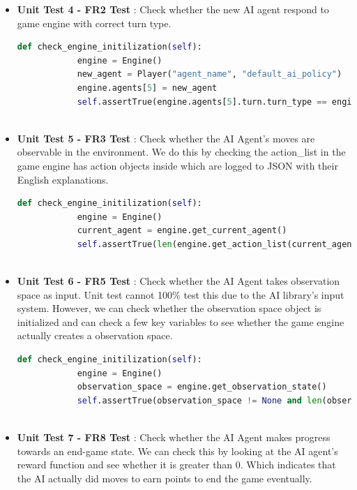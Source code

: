 \documentclass[12pt, titlepage]{article}
\providecommand{\DIFaddtex}[1]{{\protect\color{blue}\uwave{#1}}} %
\providecommand{\DIFaddbegin}{} %
\providecommand{\DIFaddend}{} %
\providecommand{\DIFadd}[1]{\texorpdfstring{\DIFaddtex{#1}}{#1}} %
\begin{document}
\begin{itemize}
    \item \textbf{Unit Test 4 - FR2 Test \DIFaddbegin \DIFadd{(\ref{FRT2})}\DIFaddend }: Check whether the new AI agent respond to game engine with correct turn type.

    \begin{lstlisting}[language=Python]
        def check_engine_initilization(self):
            engine = Engine()
            new_agent = Player("agent_name", "default_ai_policy")
            engine.agents[5] = new_agent
            self.assertTrue(engine.agents[5].turn.turn_type == engine.turn.turn_type)
    
\end{lstlisting}

    \item \textbf{Unit Test 5 - FR3 Test \DIFaddbegin \DIFadd{(\ref{FRT3})}\DIFaddend }: Check whether the AI Agent’s moves are observable in the environment. We do this by checking the action\_list in the game engine has action objects inside which are logged to JSON with their English explanations.

    \begin{lstlisting}[language=Python]
        def check_engine_initilization(self):
            engine = Engine()
            current_agent = engine.get_current_agent()
            self.assertTrue(len(engine.get_action_list(current_agent)) > 0)
    
\end{lstlisting}

    \item \textbf{Unit Test 6 - FR5 Test \DIFaddbegin \DIFadd{(\ref{FRT5})}\DIFaddend }: Check whether the AI Agent takes observation space as input. Unit test cannot 100\% test this due to the AI library's input system. However, we can check whether the observation space object is initialized and can check a few key variables to see whether the game engine actually creates a observation space.

    \begin{lstlisting}[language=Python]
        def check_engine_initilization(self):
            engine = Engine()
            observation_space = engine.get_observation_state()
            self.assertTrue(observation_space != None and len(observation_space.map) > 0)
    
\end{lstlisting}

    \item \textbf{Unit Test 7 - FR8 Test \DIFaddbegin \DIFadd{(\ref{FRT8})}\DIFaddend }: Check whether the AI Agent makes progress towards an end-game state. We can check this by looking at the AI agent's reward function and see whether it is greater than 0. Which indicates that the AI actually did moves to earn points to end the game eventually.


\end{itemize}
\end{document}
